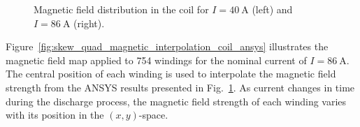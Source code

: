 \begin{figure}[H]
    \centering
    \caption{Magnetic field distribution in the coil for $I=40~\text{A}$ (left) and $I=86~\text{A}$ (right).}
    \label{fig:skew_quad_magnetic_results_coil_ansys}
\end{figure}

Figure~\ref{fig:skew_quad_magnetic_interpolation_coil_ansys} illustrates the magnetic field map applied to 754 windings for the nominal current of $I=86~\text{A}$. The central position of each winding is used to interpolate the magnetic field strength from the ANSYS results presented in Fig.~\ref{fig:skew_quad_magnetic_results_coil_ansys}. As current changes in time during the discharge process, the magnetic field strength of each winding varies with its position in the $(x,y)$-space.


